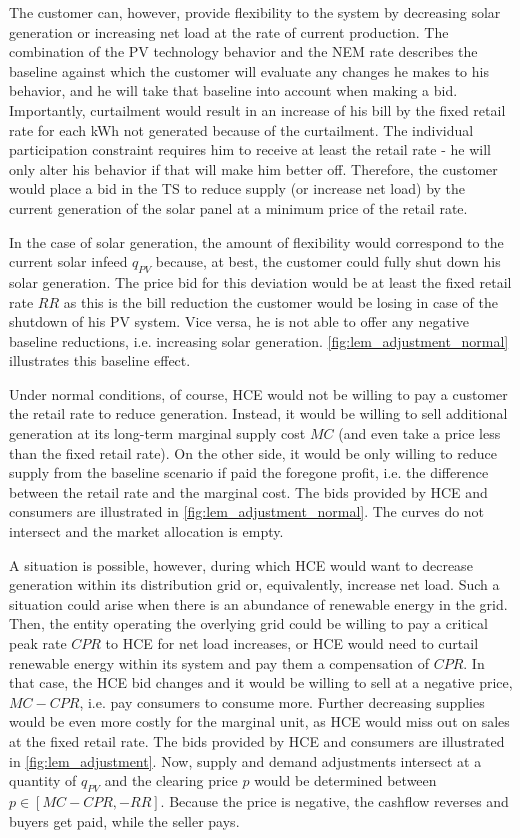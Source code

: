 The customer can, however, provide flexibility to the system by decreasing solar generation or increasing net load at the rate of current production. 
The combination of the PV technology behavior and the NEM rate describes the baseline against which the customer will evaluate any changes he makes to his behavior, and he will take that baseline into account when making a bid.
Importantly, curtailment would result in an increase of his bill by the fixed retail rate for each kWh not generated because of the curtailment. The individual participation constraint requires him to receive at least the retail rate - he will only alter his behavior if that will make him better off. Therefore, the customer would place a bid in the TS to reduce supply (or increase net load) by the current generation of the solar panel at a minimum price of the retail rate.

In the case of solar generation, the amount of flexibility would correspond to the current solar infeed $q_{PV}$ because, at best, the customer could fully shut down his solar generation. The price bid for this deviation would be at least the fixed retail rate $RR$ as this is the bill reduction the customer would be losing in case of the shutdown of his PV system. Vice versa, he is not able to offer any negative baseline reductions, i.e. increasing solar generation. \cref{fig:lem_adjustment_normal} illustrates this baseline effect.

Under normal conditions, of course, HCE would not be willing to pay a customer the retail rate to reduce generation. Instead, it would be willing to sell additional generation at its long-term marginal supply cost $MC$ (and even take a price less than the fixed retail rate). On the other side, it would be only willing to reduce supply from the baseline scenario if paid the foregone profit, i.e. the difference between the retail rate and the marginal cost. The bids provided by HCE and consumers are illustrated in \cref{fig:lem_adjustment_normal}. The curves do not intersect and the market allocation is empty.

A situation is possible, however, during which HCE would want to decrease generation within its distribution grid or, equivalently, increase net load. Such a situation could arise when there is an abundance of renewable energy in the grid. Then, the entity operating the overlying grid could be willing to pay a critical peak rate $CPR$ to HCE for net load increases, or HCE would need to curtail renewable energy within its system and pay them a compensation of $CPR$. In that case, the HCE bid changes and it would be willing to sell at a negative price, $MC - CPR$, i.e. pay consumers to consume more. Further decreasing supplies would be even more costly for the marginal unit, as HCE would miss out on sales at the fixed retail rate. 
The bids provided by HCE and consumers are illustrated in \cref{fig:lem_adjustment}. Now, supply and demand adjustments intersect at a quantity of $q_{PV}$ and the clearing price $p$ would be determined between $p \in [MC - CPR, -RR]$. Because the price is negative, the cashflow reverses and buyers get paid, while the seller pays.

